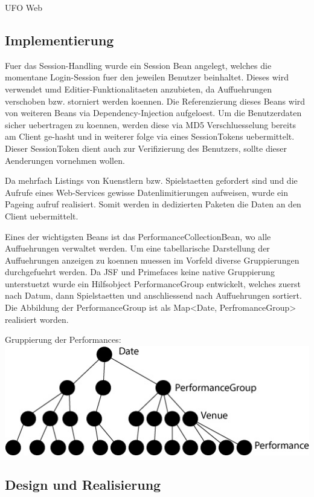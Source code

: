 \begin{section}{UFO Web}
\subsection{Implementierung}

Fuer das Session-Handling wurde ein Session Bean angelegt, welches die momentane Login-Session fuer den jeweilen Benutzer beinhaltet. Dieses wird verwendet umd Editier-Funktionalitaeten anzubieten, da Auffuehrungen verschoben bzw. storniert werden koennen. Die Referenzierung dieses Beans wird von weiteren Beans via Dependency-Injection aufgeloest. Um die Benutzerdaten sicher uebertragen zu koennen, werden diese via MD5 Verschluesselung bereits am Client ge-hasht und in weiterer folge via eines SessionTokens uebermittelt. Dieser SessionToken dient auch zur Verifizierung des Benutzers, sollte dieser Aenderungen vornehmen wollen.


Da mehrfach Listings von Kuenstlern bzw. Spielstaetten gefordert sind und die Aufrufe eines Web-Services gewisse Datenlimitierungen aufweisen, wurde ein Pageing aufruf realisiert. Somit werden in dedizierten Paketen die Daten an den Client uebermittelt.

Eines der wichtigsten Beans ist das PerformanceCollectionBean, wo alle Auffuehrungen verwaltet werden. Um eine tabellarische Darstellung der Auffuehrungen anzeigen zu koennen muessen im Vorfeld diverse Gruppierungen durchgefuehrt werden. Da JSF und Primefaces keine native Gruppierung unterstuetzt wurde ein Hilfsobject PerformanceGroup entwickelt, welches zuerst nach Datum, dann Spielstaetten und anschliessend nach Auffuehrungen sortiert. Die Abbildung der PerformanceGroup ist als Map<Date, PerfromanceGroup> realisiert worden. 

Gruppierung der Performances: \\
\includegraphics[angle=0, scale=0.65]{./img/tree.jpg}
\FloatBarrier

\subsection{Design und Realisierung}


\end{section}
